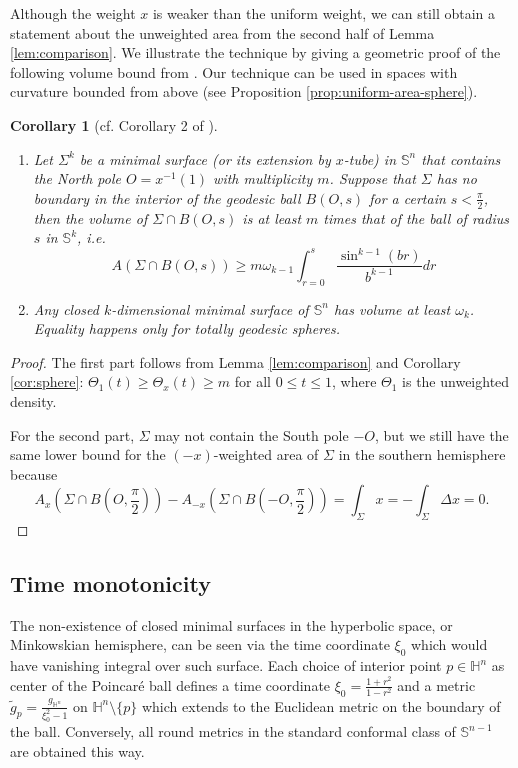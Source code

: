 \documentclass[11pt]{article}
\newtheorem{corollary}[theorem]{Corollary}
\begin{document}
Although the weight \(x\) is weaker than the uniform weight, we can still obtain a
statement about the unweighted area from the second
half of Lemma \ref{lem:comparison}. We illustrate the technique by giving a geometric proof of the following volume
bound from \cite{Cheng.etal84_HeatEquationsMinimal}. Our technique can be used in spaces with curvature bounded from above (see Proposition \ref{prop:uniform-area-sphere}).
\begin{corollary}[cf. Corollary 2 of \cite{Cheng.etal84_HeatEquationsMinimal}]
\begin{enumerate}
\item Let \(\Sigma^k\) be a minimal surface (or its extension by \(x\)-tube) in \(\mathbb{S}^n\) that contains the North pole \(O =
   x^{-1}(1)\) with multiplicity \(m\). Suppose that \(\Sigma\) has no boundary in the interior of the geodesic
ball \(B(O,s)\) for a certain \(s < \frac{\pi}{2}\), then the volume of \(\Sigma\cap B(O,s)\) is at least \(m\) times that of the ball of radius \(s\) in \(\mathbb{S}^k\), i.e.
\[
     A(\Sigma\cap B(O,s)) \geq m \omega_{k-1}\int_{r=0}^{s} \frac{\sin^{k-1}(br)}{b^{k-1}}dr 
   \]
\item Any closed \(k\)-dimensional minimal surface of \(\mathbb{S}^n\) has volume at least \(\omega_k\). Equality happens only for totally geodesic spheres.
\end{enumerate}
\end{corollary}
\begin{proof}
The first part follows from Lemma \ref{lem:comparison} and Corollary \ref{cor:sphere}:  \(\Theta_1(t)\geq \Theta_x(t)\geq m\) for all \(0\leq
 t\leq 1\), where \(\Theta_1\) is the unweighted density. 

For the second part, \(\Sigma\) may not contain the
South pole \(-O\), but we still have the same lower bound for the \((-x)\)-weighted area of \(\Sigma\) in the southern hemisphere because
\[
A_x(\Sigma\cap B(O,\frac{\pi}{2})) - A_{-x}(\Sigma\cap B(-O,\frac{\pi}{2})) = \int_\Sigma x = -\int_\Sigma \Delta x = 0.
\]
\end{proof}

\subsection{Time monotonicity}
\label{sec:org0e74b7d}
The non-existence of closed minimal surfaces in the hyperbolic space, or
Minkowskian hemisphere, can
be seen via the time coordinate \(\xi_0\) which would have vanishing integral over such
surface. Each choice of interior point \(p\in \mathbb{H}^n\) as center of the Poincaré ball defines a
time coordinate \(\xi_0=\frac{1+r^2}{1-r^2}\) and a metric
\(\tilde g_p = \frac{g_{\mathbb{H}^n}}{\xi_0^2 - 1}\) on \({\mathbb{H}^n\setminus\{p\}}\) which extends to the Euclidean metric on the boundary of
the ball.  Conversely, all round metrics in
the standard conformal class of \(\mathbb{S}^{n-1}\) are obtained this way. 
\end{document}
